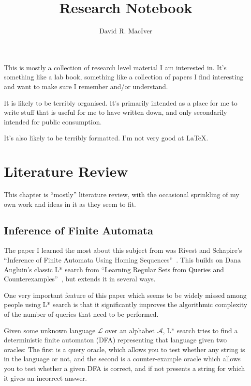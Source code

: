 \documentclass[a4paper]{book}
\title{Research Notebook}
\author{David R. MacIver}
\begin{document}
\maketitle

This is mostly a collection of research level material I am interested in.
It's something like a lab book,
something like a collection of papers I find interesting and want to make sure I remember and/or understand.

It is likely to be terribly organised.
It's primarily intended as a place for me to write stuff that is useful for me to have written down,
and only secondarily intended for public consumption.

It's also likely to be terribly formatted.
I'm not very good at \LaTeX.

\tableofcontents

\chapter{Literature Review}

This chapter is ``mostly'' literature review,
with the occasional sprinkling of my own work and ideas in it as they seem to fit.

\section{Inference of Finite Automata}

The paper I learned the most about this subject from was Rivest and Schapire's ``Inference of Finite Automata Using Homing Sequences''~\cite{DBLP:journals/iandc/RivestS93}.
This builds on Dana Angluin's classic L* search from ``Learning Regular Sets from Queries and Counterexamples''~\cite{DBLP:journals/iandc/Angluin87},
but extends it in several ways.

One very important feature of this paper which seems to be widely missed among people using L* search is that it significantly improves the algorithmic complexity of the number of queries that need to be performed.

Given some unknown language \(\mathcal{L}\) over an alphabet \(\mathcal{A}\),
L* search tries to find a deterministic finite automaton (DFA) representing that language given two oracles:
The first is a query oracle,
which allows you to test whether any string is in the language or not,
and the second is a counter-example oracle which allows you to test whether a given DFA is correct,
and if not presents a string for which it gives an incorrect answer.
\end{document}
